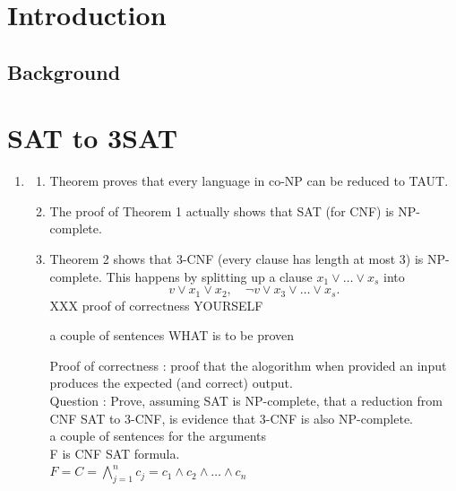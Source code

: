 \documentclass[a4paper]{report}
\begin{document}
\chapter {Introduction}
\label{cha:Introduction}

\section{Background}
\label{sec:Background}



\chapter{SAT to 3SAT}
\label{cha:sat13}

\begin{enumerate}
\item \cite{Cook1971NP}
  \begin{enumerate}
  \item Theorem proves that every language in co-NP can be reduced to TAUT.
  \item The proof of Theorem 1 actually shows that SAT (for CNF) is NP-complete.
  \item Theorem 2 shows that 3-CNF (every clause has length at most 3) is NP-complete. This happens by splitting up a clause $x_1 \vee \dots \vee x_s$ into
    \begin{displaymath}
      v \vee x_1 \vee x_2, \quad \neg v \vee x_3 \vee \dots \vee x_s.
    \end{displaymath}
XXX proof of correctness YOURSELF

a couple of sentences WHAT is to be proven

Proof of correctness : proof that the alogorithm when provided an input produces the expected (and correct) output.\\

Question : Prove, assuming SAT is NP-complete, that a reduction from CNF SAT to 3-CNF, is evidence that 3-CNF is also NP-complete.\\

a couple of sentences for the arguments
\\
F is CNF SAT formula.\\ 
$F =  C = \bigwedge_{j=1}^{n} c_j = c_1 \wedge c_2 \wedge \dots \wedge c_n$


\end{enumerate}
\end{enumerate}
\end{document}
